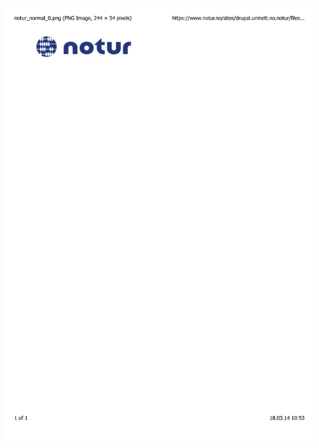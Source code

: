 \begin{frame}
\begin{columns}
\begin{column}[b]{0.5\linewidth}
        \vspace{10mm}

	\includegraphics[scale=0.6, clip, viewport = 100 730 350 800]{figures/notur.pdf}

        \vspace{20mm}
    \end{column}
    \end{columns}
\end{frame}

